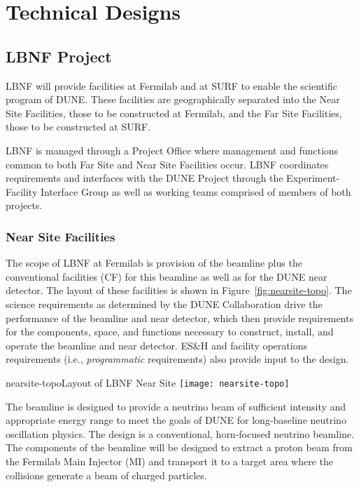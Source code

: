 
\chapter{Technical Designs}
\label{v1ch:tech-designs}



\section{LBNF Project}

LBNF will provide facilities at Fermilab and at SURF to enable the scientific program of DUNE. These facilities are geographically separated into the Near Site Facilities, those to be constructed at Fermilab, and the Far Site Facilities, those to be constructed at SURF. %

LBNF is managed through a Project Office where management and functions common to both Far Site and Near Site Facilities occur. LBNF coordinates requirements and interfaces with the DUNE Project through the Experiment-Facility Interface Group as well as working teams comprised of members of both projects. 

\subsection{Near Site Facilities}

The scope of LBNF at Fermilab is provision of the beamline plus the conventional facilities (CF) for this beamline as well as for the DUNE near detector. The layout of these facilities is shown in Figure~\ref{fig:nearsite-topo}. The science requirements as determined by the DUNE %
Collaboration drive the performance of the beamline and near detector, which then provide requirements for the components, space, and functions necessary to construct, install, and operate the beamline and near detector. ES\&H and facility operations requirements (i.e., \textit{programmatic} requirements) also provide input to the design.

\begin{cdrfigure}{nearsite-topo}{Layout of LBNF Near Site}
  \texttt{[image: nearsite-topo]}
\end{cdrfigure}


The beamline is designed to provide a neutrino beam of sufficient intensity and appropriate energy range to meet the goals of DUNE for long-baseline neutrino oscillation physics. The design is a conventional, horn-focused neutrino beamline. The components of the beamline will be designed to extract a proton beam from the Fermilab Main Injector (MI) and transport it to a target area where the collisions generate a beam of charged particles. 

